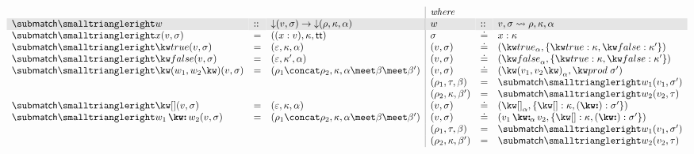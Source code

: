 $\begin{array}{lll|lll}
   \arrayrulecolor{lightgray}
   &&&\textit{where}
   \\
   \rowcolor{verylightgray}
   \matchFwdF{w} &::& \Below{(v,\sigma)} \to \Below{(\rho,\kappa, \alpha)}
   &w &::& v, \sigma \match \rho, \kappa, \alpha
   \\
   \matchFwdF{x}(v, \sigma)
   &=&
   (\bind{x}{v}, \kappa, \TT)
   &
   \sigma &\eq& \elimVar{x}{\kappa}
   \\
   \matchFwdF{\matchTrue}(v, \sigma)
   &=&
   (\seqEmpty, \kappa, \alpha)
   &
   (v, \sigma) &\eq& (\annTrue{\alpha}, \elimBool{\kappa}{\kappa'})
   \\
   \matchFwdF{\matchFalse}(v, \sigma)
   &=&
   (\seqEmpty, \kappa', \alpha)
   &
   (v, \sigma) &\eq& (\annFalse{\alpha}, \elimBool{\kappa}{\kappa'})
   \\
   \matchFwdF{\matchPair{w_1}{w_2}}(v, \sigma)
   &=&
   (\rho_1 \concat \rho_2, \kappa, \alpha \meet \beta \meet \beta')
   &
   (v, \sigma) &\eq& (\annPair{v_1}{v_2}{\alpha}, \elimProd{\sigma'})
   \\
   &&&
   (\rho_1, \tau, \beta) &=& \matchFwdF{w_1}(v_1,\sigma')
   \\
   &&&
   (\rho_2, \kappa, \beta') &=& \matchFwdF{w_2}(v_2,\tau)
   \\
   \matchFwdF{\matchNil}(v, \sigma)
   &=&
   (\seqEmpty, \kappa, \alpha)
   &
   (v, \sigma) &\eq& (\annNil{\alpha}, \elimList{\kappa}{\sigma'})
   \\
   \matchFwdF{\matchCons{w_1}{w_2}}(v, \sigma)
   &=&
   (\rho_1 \concat \rho_2, \kappa, \alpha \meet \beta \meet \beta')
   &
   (v, \sigma) &\eq& (\annCons{v_1}{v_2}{\alpha}, \elimList{\kappa}{\sigma'})
   \\
   &&&
   (\rho_1, \tau, \beta) &=& \matchFwdF{w_1}(v_1,\sigma')
   \\
   &&&
   (\rho_2, \kappa, \beta') &=& \matchFwdF{w_2}(v_2,\tau)
\end{array}$\\[3mm]

